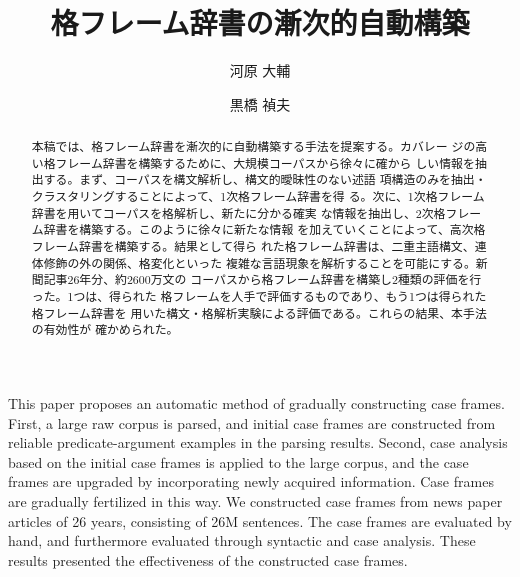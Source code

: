 \documentclass[fleqn]{nlp}
\begin{document}
\setcounter{page}{1}
\setcounter{Volume}{10}
\setcounter{Number}{1}
\setcounter{Month}{1}

\setcounter{secnumdepth}{2}

\title{格フレーム辞書の漸次的自動構築}
\author{河原 大輔 \and 黒橋 禎夫
}



\begin{abstract}
 本稿では、格フレーム辞書を漸次的に自動構築する手法を提案する。カバレー
 ジの高い格フレーム辞書を構築するために、大規模コーパスから徐々に確から
 しい情報を抽出する。まず、コーパスを構文解析し、構文的曖昧性のない述語
 項構造のみを抽出・クラスタリングすることによって、1次格フレーム辞書を得
 る。次に、1次格フレーム辞書を用いてコーパスを格解析し、新たに分かる確実
 な情報を抽出し、2次格フレーム辞書を構築する。このように徐々に新たな情報
 を加えていくことによって、高次格フレーム辞書を構築する。結果として得ら
 れた格フレーム辞書は、二重主語構文、連体修飾の外の関係、格変化といった
 複雑な言語現象を解析することを可能にする。新聞記事26年分、約2600万文の
 コーパスから格フレーム辞書を構築し2種類の評価を行った。1つは、得られた
 格フレームを人手で評価するものであり、もう1つは得られた格フレーム辞書を
 用いた構文・格解析実験による評価である。これらの結果、本手法の有効性が
 確かめられた。
\end{abstract}




\begin{eabstract}
 This paper proposes an automatic method of gradually constructing case
 frames. First, a large raw corpus is parsed, and initial case frames
 are constructed from reliable predicate-argument examples in the
 parsing results. Second, case analysis based on the initial case frames
 is applied to the large corpus, and the case frames are upgraded by
 incorporating newly acquired information. Case frames are gradually
 fertilized in this way. We constructed case frames from news paper
 articles of 26 years, consisting of 26M sentences. The case frames are
 evaluated by hand, and furthermore evaluated through syntactic and case
 analysis. These results presented the effectiveness of the constructed
 case frames.
\end{eabstract}
\end{document}
